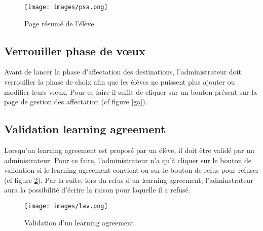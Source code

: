 \begin{figure}[H]
	\centering
	\texttt{[image: images/psa.png]}
	\caption{Page résumé de l'élève}
	\label{psa}
\end{figure}

\subsection{Verrouiller phase de vœux}

Avant de lancer la phase d'affectation des destinations, l'administrateur doit verrouiller la phase de choix afin que les élèves ne puissent plus ajouter ou modifier leurs vœux. Pour ce faire il suffit de cliquer sur un bouton présent sur la page de gestion des affectation (cf figure \ref{ga}).

\subsection{Validation learning agreement}

Lorsqu'un learning agreement est proposé par un élève, il doit être validé par un administrateur. Pour ce faire, l'administrateur n'a qu'à cliquer sur le bouton de validation si le learning agreement convient ou sur le bouton de refus pour refuser (cf figure \ref{lav}).
\smallbreak
Par la suite, lors du refus d'un learning agreement, l'adminstrateur aura la possibilité d'écrire la raison pour laquelle il a refusé.

\begin{figure}[H]
	\centering
	\texttt{[image: images/lav.png]}
	\caption{Validation d'un learning agreement}
	\label{lav}
\end{figure}

